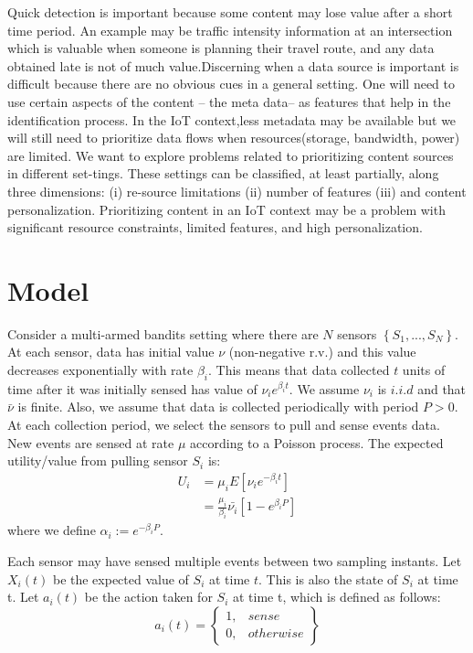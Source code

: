 \documentclass[conference]{IEEEtran}
\begin{document}
Quick detection is important because some content may lose value after a short time period. An example may be traffic intensity information at an intersection which is valuable when someone is planning their travel route, and any data obtained late is not of much value.Discerning when a data source is important is difficult because there are no obvious cues in a general setting. One will need to use certain aspects of the content – the meta data– as features that help in the identification process.  In the IoT context,less metadata may be available but we will still need to prioritize data flows when resources(storage, bandwidth, power) are limited. We want to explore problems related to prioritizing content sources in different set-tings.  These settings can be classified, at least partially, along three dimensions:  (i) re-source limitations (ii) number of features (iii) and content personalization. Prioritizing content in an IoT context may be a problem with significant resource constraints, limited features,  and high personalization. 

\section{Model}
Consider a multi-armed bandits setting where there are $N$ sensors $\left \{ S_1, ..., S_N \right \}$. At each sensor, data has initial value $\nu$ (non-negative r.v.) and this value decreases exponentially with rate $\beta_i$. This means that data collected $t$ units of time after it was initially sensed has value of $\nu_i e^{\beta_i t}$. We assume $\nu_i$ is $i.i.d$ and that $\bar{\nu}$ is finite. Also, we assume that data is collected periodically with period $P>0$. At each collection period, we select the sensors to pull and sense events data. New events are sensed at rate $\mu$ according to a Poisson process. The expected utility/value from pulling sensor $S_i$ is:
\begin{align*}
  U_i & = \mu_i E\left [\nu_i e^{-\beta_i t}  \right ]\\
  &= \frac{\mu_i}{\beta_i} \bar{\nu_i} \left [1 - e^{\beta_i P}  \right ] 
\end{align*}
where we define $\alpha_i:= e^{-\beta_i P}$. 

Each sensor may have sensed multiple events between two sampling instants. Let $X_i(t)$ be the expected value of $S_i$ at time $t$. This is also the state of $S_i$ at time t. Let $a_i(t)$ be the action taken for $S_i$ at time t, which is defined as follows:
\begin{equation}
          a_i(t)=
          \left\{
            \begin{array}{ll}
              1, &  sense\\
              0, & otherwise
            \end{array}
          \right \}
\end{equation}
\end{document}
